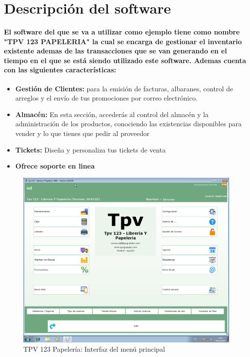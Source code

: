 \documentclass[12pt,a4paper]{ articule }
\begin{document}
\section{Descripción del software}
\paragraph{El software del que se va a utilizar como ejemplo tiene como nombre "TPV 123 PAPELERIA" la cual se encarga de gestionar el inventario existente ademas de las transacciones que se van generando en el tiempo en el que se está siendo utilizado este software. Ademas cuenta con las siguientes características:}
\begin{itemize}
\item \textbf{Gestión de Clientes: }para la emisión de facturas, albaranes, control de arreglos y el envío de tus promociones por correo electrónico.
\item \textbf{Almacén: }En esta sección, accederás al control del almacén y la administración de los productos, conociendo las existencias disponibles para vender y lo que tienes que pedir al proveedor
\item \textbf{Tickets: }Diseña y personaliza tus tickets de venta
\item \textbf{Ofrece soporte en linea}
\end{itemize}

\begin{figure}[hbtp]
\caption{TPV 123 Papelería: Interfaz del menú principal}
\centering
\includegraphics[scale=0.35]{tpv.png}
\end{figure}
\newpage
\end{document}
